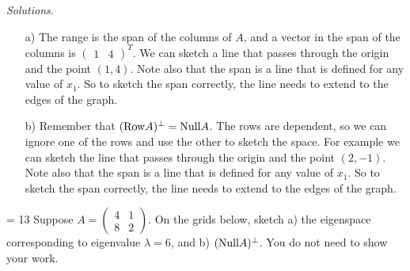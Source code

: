 \ifnum {} {\color{DarkBlue} \textit{Solutions.} \begin{itemize}
    \item[a)] The range is the span of the columns of $A$, and a vector in the span of the columns is $\begin{pmatrix} 1 & 4\end{pmatrix}^T$. We can sketch a line that passes through the origin and the point $(1,4)$. Note also that the span is a line that is defined for any value of $x_1$. So to sketch the span correctly, the line needs to extend to the edges of the graph. 
    \item[b)] Remember that $(\text{Row} A)^{\perp} = \text{Null} A$. The rows are dependent, so we can ignore one of the rows and use the other to sketch the space. For example we can sketch the line that passes through the origin and the point $(2,-1)$. Note also that the span is a line that is defined for any value of $x_1$. So to sketch the span correctly, the line needs to extend to the edges of the graph. 
    \end{itemize}
    \vspace{-12pt}
    \begin{center}
    \qquad
    \end{center}   }
   \else
    \vspace{-12pt}
    \begin{center}
    \qquad
    \end{center}   
   \fi
\fi



\ifnum \Version = 13
\question[2] Suppose $A = \begin{pmatrix} 4&1\\8&2 \end{pmatrix}$. On the grids below, sketch a) the eigenspace corresponding to eigenvalue $\lambda = 6$, and b) $(\text{Null} A)^{\perp}$. You do not need to show your work. 


